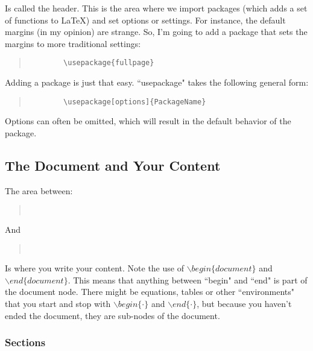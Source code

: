 Is called the header.  This is the area where we import packages (which adds a set of functions to LaTeX) and set options or settings.  For instance, the default margins (in my opinion) are strange.  So, I'm going to add a package that sets the margins to more traditional settings:

\begin{quote}
	\begin{verbatim}
		\usepackage{fullpage}
	\end{verbatim}
\end{quote}

Adding a package is just that easy.  ``usepackage" takes the following general form:

\begin{quote}
	\begin{verbatim}
		\usepackage[options]{PackageName}
	\end{verbatim}
\end{quote}

Options can often be omitted, which will result in the default behavior of the package. 

\subsection{The Document and Your Content}

The area between:

\begin{quote}
	\begin{verbatim}
		 
	\end{verbatim}
\end{quote}

And

\begin{quote}
	\begin{verbatim}
		 
	\end{verbatim}
\end{quote}

Is where you write your content.  Note the use of $\backslash begin\{document\}$ and $\backslash end\{document\}$.  This means that anything between ``begin" and ``end" is part of the document node.  There might be equations, tables or other ``environments" that you start and stop with $\backslash begin\{\cdot\}$ and $\backslash end\{\cdot\}$, but because you haven't ended the document, they are sub-nodes of the document.

\subsubsection{Sections}

